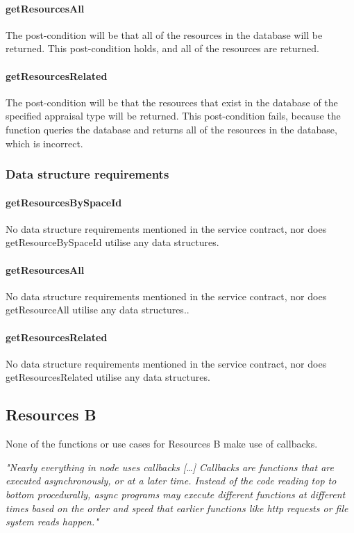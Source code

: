\documentclass[a4paper]{article}
\begin{document}
\paragraph{getResourcesAll}
The post-condition will be that all of the resources in the database will be returned. This post-condition holds, and all of the resources are returned.

\paragraph{getResourcesRelated}
The post-condition will be that the resources that exist in the database of the specified appraisal type will be returned. This post-condition fails, because the function queries the database and returns all of the resources in the database, which is incorrect.

\subsubsection {Data structure requirements}

\paragraph{getResourcesBySpaceId}
No data structure requirements mentioned in the service contract, nor does getResourceBySpaceId utilise any data structures.

\paragraph{getResourcesAll}
No data structure requirements mentioned in the service contract, nor does getResourceAll utilise any data structures..

\paragraph{getResourcesRelated}
No data structure requirements mentioned in the service contract, nor does getResourcesRelated utilise any data structures.

\subsection {Resources B}
None of the functions or use cases for Resources B make use of callbacks.

\textit{ "Nearly everything in node uses callbacks […] Callbacks are functions that are executed asynchronously, or at a later time. Instead of the code reading top to bottom procedurally, async programs may execute different functions at different times based on the order and speed that earlier functions like http requests or file system reads happen."}
\end{document}
